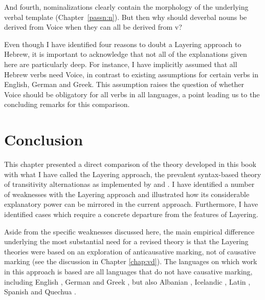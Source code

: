 And fourth, nominalizations clearly contain the morphology of the underlying verbal template (Chapter~\ref{passn:n}). But then why should deverbal nouns be derived from Voice when they can all be derived from v?

Even though I have identified four reasons to doubt a Layering approach to Hebrew, it is important to acknowledge that not all of the explanations given here are particularly deep. For instance, I have implicitly assumed that all Hebrew verbs need Voice, in contrast to existing assumptions for certain verbs in English, German and Greek. This assumption raises the question of whether Voice should be obligatory for all verbs in all languages, a point leading us to the concluding remarks for this comparison.



\section{Conclusion} \label{aas:conc}
This chapter presented a direct comparison of the theory developed in this book with what I have called the Layering approach, the prevalent syntax-based theory of transitivity alternationas as implemented by \cite{schaefer08,schaefer17oup} and \cite{layering15}. I have identified a number of weaknesses with the Layering approach and illustrated how its considerable explanatory power can be mirrored in the current approach. Furthermore, I have identified cases which require a concrete departure from the features of Layering.

Aside from the specific weaknesses discussed here, the main empirical difference underlying the most substantial need for a revised theory is that the Layering theories were based on an exploration of anticausative marking, not of causative marking (see the discussion in Chapter \ref{chap:vd}). The languages on which work in this approach is based are all languages that do not have causative marking, including English \citep{myler16mit}, German \citep{schaefer17oup} and Greek \citep{spathasetal15}, but also Albanian \citep{kallulli13}, Icelandic \cite{wood15springer}, Latin \citep{embick04,kastnerzu17}, Spanish \citep{schaefervivanco16} and Quechua \citep{myler16mit}.

